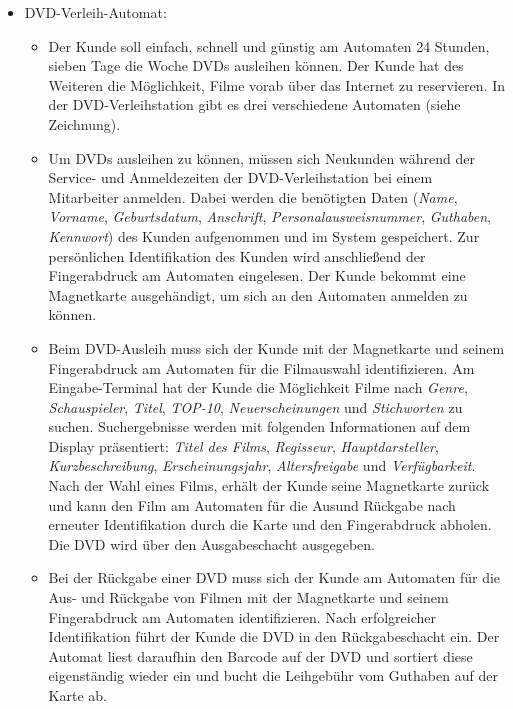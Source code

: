 \documentclass{lehramt-informatik}
\begin{document}
\begin{itemize}
\item DVD-Verleih-Automat:

\begin{itemize}
\item Der Kunde soll einfach, schnell und günstig am Automaten 24
Stunden, sieben Tage die Woche DVDs ausleihen können. Der Kunde hat des
Weiteren die Möglichkeit, Filme vorab über das Internet zu reservieren.
In der DVD-Verleihstation gibt es drei verschiedene Automaten (siehe
Zeichnung).

\item Um DVDs ausleihen zu können, müssen sich Neukunden während der
Service- und Anmeldezeiten der DVD-Verleihstation bei einem Mitarbeiter
anmelden. Dabei werden die benötigten Daten (\emph{Name},
\emph{Vorname}, \emph{Geburtsdatum}, \emph{Anschrift},
\emph{Personalausweisnummer}, \emph{Guthaben}, \emph{Kennwort}) des
Kunden aufgenommen und im System gespeichert. Zur persönlichen
Identifikation des Kunden wird anschließend der Fingerabdruck am
Automaten eingelesen. Der Kunde bekommt eine Magnetkarte ausgehändigt,
um sich an den Automaten anmelden zu können.

\item Beim DVD-Ausleih muss sich der Kunde mit der Magnetkarte und
seinem Fingerabdruck am Automaten für die Filmauswahl identifizieren. Am
Eingabe-Terminal hat der Kunde die Möglichkeit Filme nach \emph{Genre},
\emph{Schauspieler}, \emph{Titel}, \emph{TOP-10},
\emph{Neuerscheinungen} und \emph{Stichworten} zu suchen. Suchergebnisse
werden mit folgenden Informationen auf dem Display präsentiert:
\emph{Titel des Films}, \emph{Regisseur}, \emph{Hauptdarsteller},
\emph{Kurzbeschreibung}, \emph{Erscheinungsjahr}, \emph{Altersfreigabe}
und \emph{Verfügbarkeit}. Nach der Wahl eines Films, erhält der Kunde
seine Magnetkarte zurück und kann den Film am Automaten für die Ausund
Rückgabe nach erneuter Identifikation durch die Karte und den
Fingerabdruck abholen. Die DVD wird über den Ausgabeschacht ausgegeben.

\item Bei der Rückgabe einer DVD muss sich der Kunde am Automaten für
die Aus- und Rückgabe von Filmen mit der Magnetkarte und seinem
Fingerabdruck am Automaten identifizieren. Nach erfolgreicher
Identifikation führt der Kunde die DVD in den Rückgabeschacht ein. Der
Automat liest daraufhin den Barcode auf der DVD und sortiert diese
eigenständig wieder ein und bucht die Leihgebühr vom Guthaben auf der
Karte ab.


\end{itemize}
\end{itemize}
\end{document}
